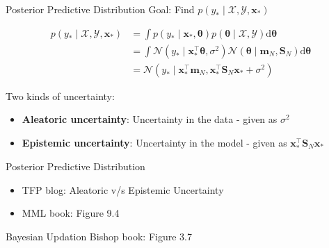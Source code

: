 \documentclass{beamer}
\begin{document}
\begin{frame}{Posterior Predictive Distribution}
    Goal: Find $p\left(y_* \mid \mathcal{X}, \mathcal{Y}, \boldsymbol{x}_*\right)$

    $$
    \begin{aligned}
        p(y_* \mid \mathcal{X}, \mathcal{Y}, \boldsymbol{x}_*) &= \int p(y_* \mid \boldsymbol{x}_*, \boldsymbol{\theta}) p(\boldsymbol{\theta} \mid \mathcal{X}, \mathcal{Y}) \mathrm{d} \boldsymbol{\theta} \\
        &= \int \mathcal{N}(y_* \mid \boldsymbol{x}_*^\top \boldsymbol{\theta}, \sigma^2) \mathcal{N}(\boldsymbol{\theta} \mid \boldsymbol{m}_N, \boldsymbol{S}_N) \mathrm{d} \boldsymbol{\theta} \\
        &= \mathcal{N}(y_* \mid \boldsymbol{x}_*^\top \boldsymbol{m}_N, \boldsymbol{x}_*^\top \boldsymbol{S}_N \boldsymbol{x}_* + \sigma^2)
        \end{aligned}
        $$

    \pause Two kinds of uncertainty:
    \begin{itemize}
        \item \textbf{Aleatoric uncertainty}: Uncertainty in the data - given as $\sigma^2$
        \item \textbf{Epistemic uncertainty}: Uncertainty in the model - given as $\boldsymbol{x}_*^\top \boldsymbol{S}_N \boldsymbol{x}_*$
    \end{itemize}
\end{frame}

\begin{frame}{Posterior Predictive Distribution}
    \begin{itemize}
        \item TFP blog: Aleatoric v/s Epistemic Uncertainty
        \item MML book: Figure 9.4
    \end{itemize}
\end{frame}

\begin{frame}{Bayesian Updation}
    Bishop book: Figure 3.7
    
\end{frame}

\end{document}
